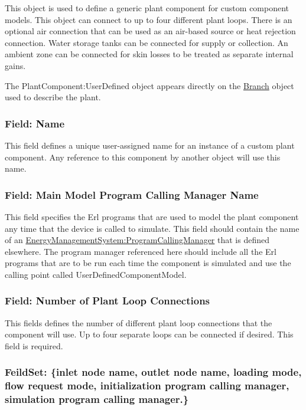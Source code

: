 This object is used to define a generic plant component for custom component models. This object can connect to up to four different plant loops. There is an optional air connection that can be used as an air-based source or heat rejection connection. Water storage tanks can be connected for supply or collection. An ambient zone can be connected for skin losses to be treated as separate internal gains.

The PlantComponent:UserDefined object appears directly on the \hyperref[branch]{Branch} object used to describe the plant.

\subsubsection{Field: Name}\label{field-name-3-035}

This field defines a unique user-assigned name for an instance of a custom plant component. Any reference to this component by another object will use this name.

\subsubsection{Field: Main Model Program Calling Manager Name}\label{field-main-model-program-calling-manager-name}

This field specifies the Erl programs that are used to model the plant component any time that the device is called to simulate. This field should contain the name of an \hyperref[energymanagementsystemprogramcallingmanager]{\hyperref[energymanagementsystemprogram]{EnergyManagementSystem:Program}CallingManager} that is defined elsewhere. The program manager referenced here should include all the Erl programs that are to be run each time the component is simulated and use the calling point called UserDefinedComponentModel.

\subsubsection{Field: Number of Plant Loop Connections}\label{field-number-of-plant-loop-connections-2}

This fields defines the number of different plant loop connections that the component will use. Up to four separate loops can be connected if desired. This field is required.

\subsubsection{FeildSet: \{inlet node name, outlet node name, loading mode, flow request mode, initialization program calling manager, simulation program calling manager.\}}\label{feildset-inlet-node-name-outlet-node-name-loading-mode-flow-request-mode-initialization-program-calling-manager-simulation-program-calling-manager.}


